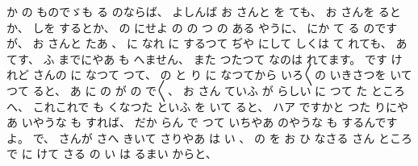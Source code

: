 %
か
の
ものでゞも
る
のならば、
%
よしんば
お
さんと
を
ても、
%
お
さんを
るとか、
%
しを
するとか、
%
の
にせよ
の
%
の
つ
の
ある
やうに、
%
にか
て
る
のですが、
%
お
さんと
たあ
、
%
に
なれ
に
するつて
ぢや
にして
しくは
て
れても、
%
あ
てす、
%
ふ
までにやあ
も
へません、
%
また
つたつて
なのは
れてます。
%
です
けれど
さんの
に
なつて
つて、
%
の
と
り
に
なつてから
いろ〳〵の
いきさつを
いて
つて
ると、
%
あ
に
の
が
の
で〳〵、
%
お
さん
ていふ
が
%
らしい
に
つて
た
ところへ、
%
これこれで%
も
くなつた
といふ
を
いて
ると、
ハア
ですかと
つた
りにやあ
いやうな
も
すれば、
%
だか
らん
で
つて
いちやあ
のやうな
も
するんですよ。
%
で、
%
さんが
さへ
きいて
さりやあ
は
い
、
%
の
を
お
ひ
なさる
さん
ところで
に
けて
さる
の
い
は
るまい
%
からと、
%
